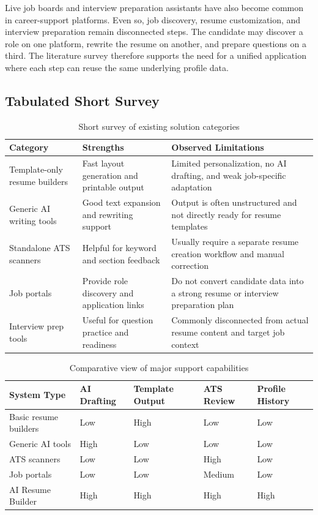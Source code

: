 \noindent Live job boards and interview preparation assistants have also become common in career-support platforms. Even so, job discovery, resume customization, and interview preparation remain disconnected steps. The candidate may discover a role on one platform, rewrite the resume on another, and prepare questions on a third. The literature survey therefore supports the need for a unified application where each step can reuse the same underlying profile data.

\subsection{Tabulated Short Survey}
\begin{table}[H]
\centering
\caption{Short survey of existing solution categories}
\begin{tabular}{|p{3.1cm}|p{4.2cm}|p{5.0cm}|}
\hline
\textbf{Category} & \textbf{Strengths} & \textbf{Observed Limitations} \\
\hline
Template-only resume builders & Fast layout generation and printable output & Limited personalization, no AI drafting, and weak job-specific adaptation \\
\hline
Generic AI writing tools & Good text expansion and rewriting support & Output is often unstructured and not directly ready for resume templates \\
\hline
Standalone ATS scanners & Helpful for keyword and section feedback & Usually require a separate resume creation workflow and manual correction \\
\hline
Job portals & Provide role discovery and application links & Do not convert candidate data into a strong resume or interview preparation plan \\
\hline
Interview prep tools & Useful for question practice and readiness & Commonly disconnected from actual resume content and target job context \\
\hline
\end{tabular}
\end{table}

\begin{table}[H]
\centering
\caption{Comparative view of major support capabilities}
\begin{tabular}{|p{3.4cm}|p{2.0cm}|p{2.0cm}|p{2.0cm}|p{2.0cm}|}
\hline
\textbf{System Type} & \textbf{AI Drafting} & \textbf{Template Output} & \textbf{ATS Review} & \textbf{Profile History} \\
\hline
Basic resume builders & Low & High & Low & Low \\
\hline
Generic AI tools & High & Low & Low & Low \\
\hline
ATS scanners & Low & Low & High & Low \\
\hline
Job portals & Low & Low & Medium & Low \\
\hline
AI Resume Builder & High & High & High & High \\
\hline
\end{tabular}
\end{table}

